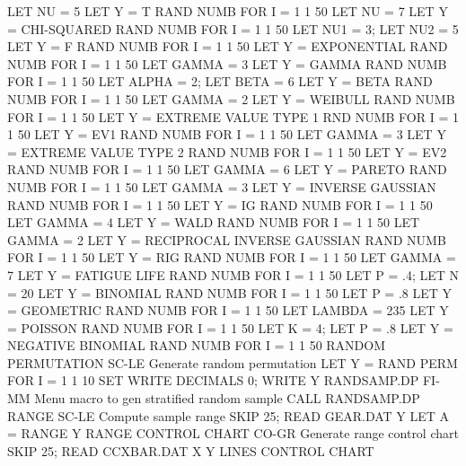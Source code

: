                     LET NU = 5
                    LET Y = T RAND NUMB FOR I = 1 1 50
                    LET NU = 7
                    LET Y = CHI-SQUARED RAND NUMB FOR I = 1 1 50
                    LET NU1 = 3; LET NU2 = 5
                    LET Y = F RAND NUMB FOR I = 1 1 50
                    LET Y = EXPONENTIAL RAND NUMB FOR I = 1 1 50
                    LET GAMMA = 3
                    LET Y = GAMMA RAND NUMB FOR I = 1 1 50
                    LET ALPHA = 2; LET BETA = 6
                    LET Y = BETA RAND NUMB FOR I = 1 1 50
                    LET GAMMA = 2
                    LET Y = WEIBULL RAND NUMB FOR I = 1 1 50
                    LET Y = EXTREME VALUE TYPE 1 RND NUMB FOR I = 1 1 50
                    LET Y = EV1 RAND NUMB FOR I = 1 1 50
                    LET GAMMA = 3
                    LET Y = EXTREME VALUE TYPE 2 RAND NUMB FOR I = 1 1 50
                    LET Y = EV2 RAND NUMB FOR I = 1 1 50
                    LET GAMMA = 6
                    LET Y = PARETO RAND NUMB FOR I = 1 1 50
                    LET GAMMA = 3
                    LET Y = INVERSE GAUSSIAN RAND NUMB FOR I = 1 1 50
                    LET Y = IG RAND NUMB FOR I = 1 1 50
                    LET GAMMA = 4
                    LET Y = WALD RAND NUMB FOR I = 1 1 50
                    LET GAMMA = 2
                    LET Y = RECIPROCAL INVERSE GAUSSIAN RAND NUMB FOR I = 1 1 50
                    LET Y = RIG RAND NUMB FOR I = 1 1 50
                    LET GAMMA = 7
                    LET Y = FATIGUE LIFE RAND NUMB FOR I = 1 1 50
                    LET P = .4; LET N = 20
                    LET Y = BINOMIAL RAND NUMB FOR I = 1 1 50
                    LET P = .8
                    LET Y = GEOMETRIC RAND NUMB FOR I = 1 1 50
                    LET LAMBDA = 235
                    LET Y = POISSON RAND NUMB FOR I = 1 1 50
                    LET K = 4; LET P = .8
                    LET Y = NEGATIVE BINOMIAL RAND NUMB FOR I = 1 1 50
RANDOM PERMUTATION          SC-LE Generate random permutation
                                  LET Y = RAND PERM FOR I = 1 1 10
                                  SET WRITE DECIMALS 0; WRITE Y
RANDSAMP.DP                 FI-MM Menu macro to gen stratified random sample
                                  CALL RANDSAMP.DP
RANGE                       SC-LE Compute sample range
                                  SKIP 25; READ GEAR.DAT Y
                                  LET A = RANGE Y
RANGE CONTROL CHART         CO-GR Generate range control chart
                                  SKIP 25; READ CCXBAR.DAT X Y
                                  LINES CONTROL CHART
